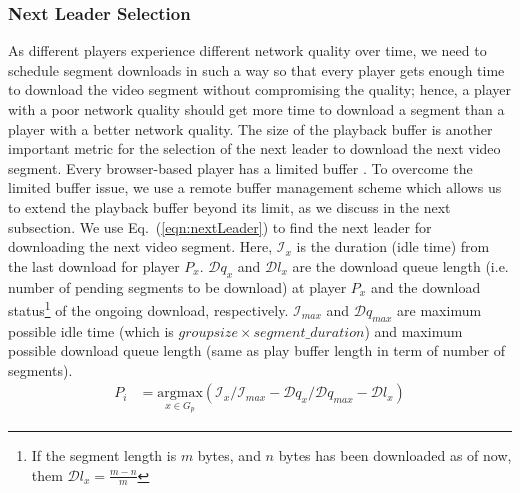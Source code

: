\subsubsection{Next Leader Selection} As different players experience different network quality over time, we need to schedule segment downloads in such a way so that every player gets enough time to download the video segment without compromising the quality; hence,  a player with a poor network quality should get more time to download a segment than a player with a better network quality. 
The size of the playback buffer is another important metric for the selection of the next leader to download the next video segment. Every browser-based player has a limited buffer \cite{sengupta2018hotdash}. 
To overcome the limited buffer issue, we use a remote buffer management scheme which allows us to extend the playback buffer beyond its limit, as we discuss in the next subsection. We use Eq.~(\ref{eqn:nextLeader}) to find the next leader for downloading the next video segment. Here, $\mathcal{I}_x$ is the duration (idle time) from the last download for player $P_x$. $\mathcal{D}{q_x}$ and $\mathcal{D}{l_x}$ are the download queue length (i.e. number of pending segments to be download) at player $P_x$ and the download status\footnote{If the segment length is $m$ bytes, and $n$ bytes has been downloaded as of now, them  $\mathcal{D}{l_x} = \frac{m-n}{m}$ } of the ongoing download, respectively. $\mathcal{I}_{max}$ and $\mathcal{D}q_{max}$ are maximum possible idle time (which is $groupsize\times segment\_duration$) and maximum possible download queue length (same as play buffer length in term of number of segments).
\begin{align}
\label{eqn:nextLeader}
P_i &= \underset{x \in G_p}{\mathrm{argmax}} \left( {\mathcal{I}_x}/{\mathcal{I}_{max}} - {\mathcal{D}{q_x}}/{\mathcal{D}q_{max}} - \mathcal{D}{l_x} \right)
\end{align}
